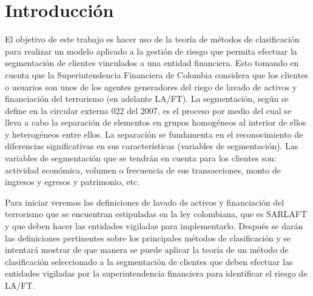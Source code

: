 \chapter{Introducción}
\label{chap:introduccion}

El objetivo de este trabajo es hacer uso de la teoría de métodos de clasificación para  realizar un modelo aplicado a la gestión de riesgo que permita efectuar la segmentación de clientes vinculados a una entidad financiera.  Esto tomando en cuenta que la Superintendencia Financiera de Colombia considera que los clientes o usuarios son unos de los agentes generadores del riego de lavado de activos y financiación del terrorismo (en adelante LA/FT). La segmentación, según se define en la circular externa 022 del 2007, es el proceso por medio del cual se lleva a cabo la separación de elementos en grupos homogéneos al interior de ellos y heterogéneos entre ellos. La separación se fundamenta en el reconocimiento de diferencias significativas en sus características (variables de segmentación).  Las variables de segmentación que se tendrán en cuenta para los clientes son: actividad económica, volumen o frecuencia de sus transacciones, monto de ingresos y egresos y patrimonio, etc.\par 


Para iniciar veremos las definiciones de lavado de activos y financiación del terrorismo que se encuentran estipuladas en la ley colombiana, que es SARLAFT y que deben hacer las entidades vigiladas para implementarlo.  Después se darán las definiciones pertinentes sobre los principales métodos de clasificación y se intentará mostrar de que manera se puede aplicar la teoría de un método de clasificación seleccionado a la segmentación de clientes que deben efectuar las entidades vigiladas por la superintendencia financiera para identificar el riesgo de LA/FT.\par 


\clearemptydoublepage

